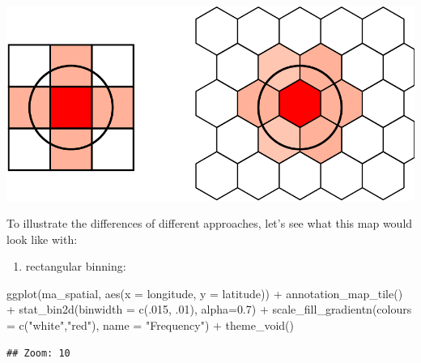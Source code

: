 \documentclass[
  krantz2]{krantz}
\makeatletter
\newenvironment{Shaded}{\begin{snugshade}}{\end{snugshade}}
\newcommand{\AttributeTok}[1]{\textcolor[rgb]{0.61,0.61,0.61}{#1}}
\newcommand{\DecValTok}[1]{\textcolor[rgb]{0.06,0.06,0.06}{#1}}
\newcommand{\FloatTok}[1]{\textcolor[rgb]{0.06,0.06,0.06}{#1}}
\newcommand{\FunctionTok}[1]{\textcolor[rgb]{0,0,0}{#1}}
\newcommand{\NormalTok}[1]{#1}
\newcommand{\SpecialCharTok}[1]{\textcolor[rgb]{0,0,0}{#1}}
\newcommand{\StringTok}[1]{\textcolor[rgb]{0.5,0.5,0.5}{#1}}
\providecommand{\tightlist}{%
  \setlength{\itemsep}{0pt}\setlength{\parskip}{0pt}}
\newenvironment{kframe}{%
\medskip{}
\setlength{\fboxsep}{.8em}
 \def\at@end@of@kframe{}%
 \ifinner\ifhmode%
  \def\at@end@of@kframe{\end{minipage}}%
  \begin{minipage}{\columnwidth}%
 \fi\fi%
 \def\FrameCommand##1{\hskip\@totalleftmargin \hskip-\fboxsep
 \colorbox{shadecolor}{##1}\hskip-\fboxsep
     \hskip-\linewidth \hskip-\@totalleftmargin \hskip\columnwidth}%
 \MakeFramed {\advance\hsize-\width
   \@totalleftmargin\z@ \linewidth\hsize
   \@setminipage}}%
 {\par\unskip\endMakeFramed%
 \at@end@of@kframe}
\renewenvironment{Shaded}{\begin{kframe}}{\end{kframe}}
\makeatother
\begin{document}
\includegraphics{crime_mapping_files/figure-latex/unnamed-chunk-127-1.pdf}

To illustrate the differences of different approaches, let's see what this map would look like with:

\begin{enumerate}
\def\labelenumi{\alph{enumi})}
\tightlist
\item
  rectangular binning:
\end{enumerate}

\begin{Shaded}
\begin{Highlighting}[]
\FunctionTok{ggplot}\NormalTok{(ma\_spatial, }\FunctionTok{aes}\NormalTok{(}\AttributeTok{x =}\NormalTok{ longitude, }\AttributeTok{y =}\NormalTok{ latitude)) }\SpecialCharTok{+} 
  \FunctionTok{annotation\_map\_tile}\NormalTok{() }\SpecialCharTok{+} 
  \FunctionTok{stat\_bin2d}\NormalTok{(}\AttributeTok{binwidth =} \FunctionTok{c}\NormalTok{(.}\DecValTok{015}\NormalTok{, .}\DecValTok{01}\NormalTok{), }\AttributeTok{alpha=}\FloatTok{0.7}\NormalTok{) }\SpecialCharTok{+} 
  \FunctionTok{scale\_fill\_gradientn}\NormalTok{(}\AttributeTok{colours =} \FunctionTok{c}\NormalTok{(}\StringTok{"white"}\NormalTok{,}\StringTok{"red"}\NormalTok{), }
                       \AttributeTok{name =} \StringTok{"Frequency"}\NormalTok{) }\SpecialCharTok{+} 
  \FunctionTok{theme\_void}\NormalTok{()}
\end{Highlighting}
\end{Shaded}

\begin{verbatim}
## Zoom: 10
\end{verbatim}
\end{document}
